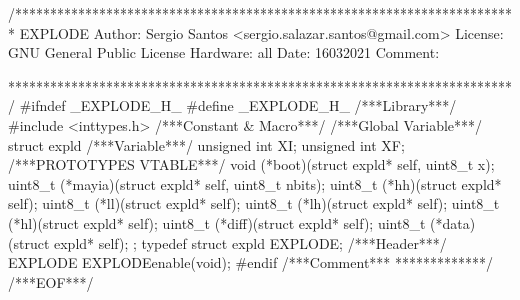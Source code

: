 \begin{verbatimtab}
/************************************************************************
EXPLODE
Author: Sergio Santos
<sergio.salazar.santos@gmail.com>
License: GNU General Public License
Hardware: all
Date: 16032021
Comment:

************************************************************************/
#ifndef _EXPLODE_H_
#define _EXPLODE_H_
/***Library***/
#include <inttypes.h>
/***Constant & Macro***/
/***Global Variable***/
struct expld{
	/***Variable***/
	unsigned int XI;
	unsigned int XF;
	/***PROTOTYPES VTABLE***/
	void (*boot)(struct expld* self, uint8_t x);
	uint8_t (*mayia)(struct expld* self, uint8_t nbits);
	uint8_t (*hh)(struct expld* self);
	uint8_t (*ll)(struct expld* self);
	uint8_t (*lh)(struct expld* self);
	uint8_t (*hl)(struct expld* self);
	uint8_t (*diff)(struct expld* self);
	uint8_t (*data)(struct expld* self);
};
typedef struct expld EXPLODE;
/***Header***/
EXPLODE EXPLODEenable(void);
#endif
/***Comment***
*************/
/***EOF***/
\end{verbatimtab}